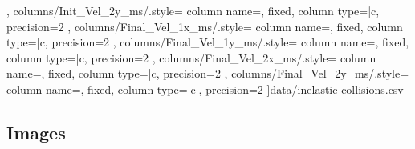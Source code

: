 \begin{table}[H]
{{        },
        columns/Init_Vel_2y_ms/.style={
            column name={},
            fixed,
            column type={|c},
            precision=2
        },
        columns/Final_Vel_1x_ms/.style={
            column name={},
            fixed,
            column type={|c},
            precision=2
        },
        columns/Final_Vel_1y_ms/.style={
            column name={},
            fixed,
            column type={|c},
            precision=2
        },
        columns/Final_Vel_2x_ms/.style={
            column name={},
            fixed,
            column type={|c},
            precision=2
        },
        columns/Final_Vel_2y_ms/.style={
            column name={},
            fixed,
            column type={|c|},
            precision=2
        }
    ]{data/inelastic-collisions.csv}
}
\end{table}

\subsection{Images}

